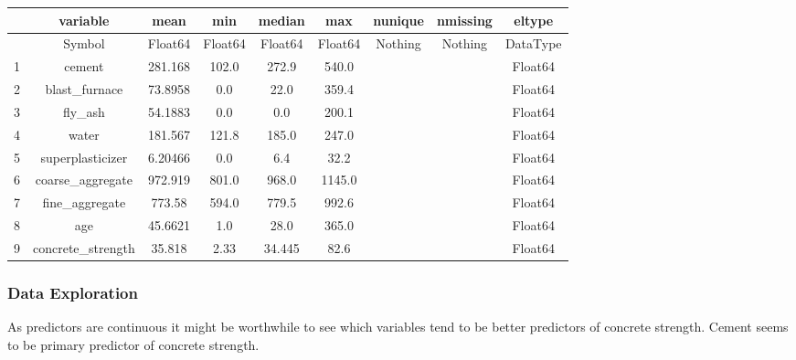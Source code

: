 \documentclass[12pt,a4paper]{article}
\begin{document}
\begin{tabular}{r|cccccccc}
	& variable & mean & min & median & max & nunique & nmissing & eltype\\
	\hline
	& Symbol & Float64 & Float64 & Float64 & Float64 & Nothing & Nothing & DataType\\
	\hline
	1 & cement & 281.168 & 102.0 & 272.9 & 540.0 &  &  & Float64 \\
	2 & blast\_furnace & 73.8958 & 0.0 & 22.0 & 359.4 &  &  & Float64 \\
	3 & fly\_ash & 54.1883 & 0.0 & 0.0 & 200.1 &  &  & Float64 \\
	4 & water & 181.567 & 121.8 & 185.0 & 247.0 &  &  & Float64 \\
	5 & superplasticizer & 6.20466 & 0.0 & 6.4 & 32.2 &  &  & Float64 \\
	6 & coarse\_aggregate & 972.919 & 801.0 & 968.0 & 1145.0 &  &  & Float64 \\
	7 & fine\_aggregate & 773.58 & 594.0 & 779.5 & 992.6 &  &  & Float64 \\
	8 & age & 45.6621 & 1.0 & 28.0 & 365.0 &  &  & Float64 \\
	9 & concrete\_strength & 35.818 & 2.33 & 34.445 & 82.6 &  &  & Float64 \\
\end{tabular}


\subsubsection{Data Exploration}
As predictors are continuous it might be worthwhile to see which variables tend to be better predictors of concrete strength.   Cement seems to be primary predictor of concrete strength.
\end{document}
